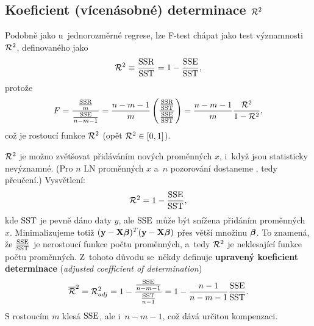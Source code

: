 \subsection{Koeficient (vícenásobné) determinace $\mathcal{R}^2$ }
 Podobně jako u~jednorozměrné regrese, lze F-test chápat jako test významnosti $\mathcal{R}^2$, definovaného jako
 $$ \mathcal{R}^2\equiv \frac{\mathrm{SSR}}{\mathrm{SST}} = 1-\frac{\mathrm{SSE}}{\mathrm{SST}}, $$
protože
 $$ F = \frac{\frac{\mathrm{SSR}}{m}}{\frac{\mathrm{SSE}}{n-m-1}} = \frac{n-m-1}{m}\left(\frac{\frac{\mathrm{SSR}}{\mathrm{SST}}}{\frac{\mathrm{SSE}}{\mathrm{SST}}} \right) = \frac{n-m-1}{m}\frac{\mathcal{R}^2}{1-\mathcal{R}^2}, $$
 což je rostoucí funkce $\mathcal{R}^2$ (opět $\mathcal{R}^2\in[0,1]$).
 \begin{remark}
 	 $\mathcal{R}^2$ je možno zvětšovat přidáváním nových proměnných $x$, i~když jsou statisticky nevýznamné. (Pro $n$ LN proměnných $x$ a~$n$ pozorování dostaneme , tedy přeučení.) Vysvětlení:
 	 $$ \mathcal{R}^2 = 1-\frac{\mathrm{SSE}}{\mathrm{SST}}, $$
 	kde $\mathrm{SST}$ je pevně dáno daty $y$, ale $\mathrm{SSE}$ může být snížena přidáním proměnných $x$. Minimalizujeme totiž $(\mathbf{y}-\mathbf{X}\boldsymbol{\beta})^T(\mathbf{y}-\mathbf{X}\boldsymbol{\beta})$ přes větší množinu $\boldsymbol{\beta}$. To znamená, že $\frac{\mathrm{SSE}}{\mathrm{SST}}$ je nerostoucí funkce počtu proměnných, a~tedy $\mathcal{R}^2$ je neklesající funkce počtu proměnných. Z~tohoto důvodu se~někdy definuje \textbf{upravený koeficient determinace} (\textit{adjusted coefficient of determination})
 	 $$ \overline{\mathcal{R}}^2 = \mathcal{R}_{adj}^2 = 1-\frac{\frac{\mathrm{SSE}}{n-m-1}}{\frac{\mathrm{SST}}{n-1}} = 1-\frac{n-1}{n-m-1}\frac{\mathrm{SSE}}{\mathrm{SST}}. $$
 	S rostoucím $m$ klesá $\mathrm{SSE}$, ale i~$n-m-1$, což dává určitou kompenzaci.
 \end{remark}
